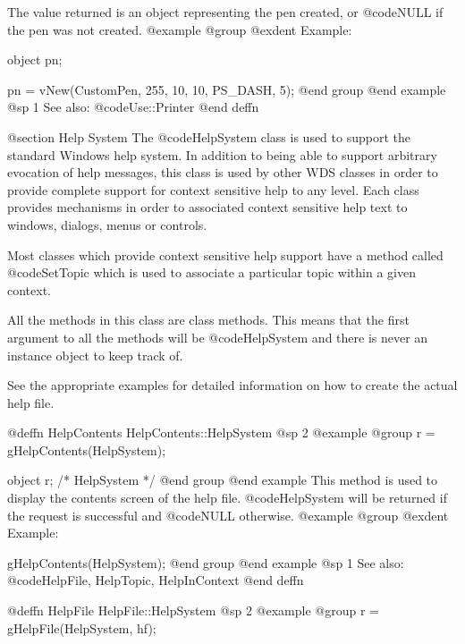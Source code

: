 The value returned is an object representing the pen created, or
@code{NULL} if the pen was not created.
@example
@group
@exdent Example:

object  pn;

pn = vNew(CustomPen, 255, 10, 10, PS_DASH, 5);
@end group
@end example
@sp 1
See also:  @code{Use::Printer}
@end deffn




@section Help System
The @code{HelpSystem} class is used to support the standard Windows
help system.  In addition to being able to support arbitrary evocation
of help messages, this class is used by other WDS classes in order to
provide complete support for context sensitive help to any level.
Each class provides mechanisms in order to associated context sensitive
help text to windows, dialogs, menus or controls.

Most classes which provide context sensitive help support have a method
called @code{SetTopic} which is used to associate a particular topic
within a given context.

All the methods in this class are class methods.  This means that
the first argument to all the methods will be @code{HelpSystem} and
there is never an instance object to keep track of.

See the appropriate examples for detailed information on how to
create the actual help file.











@deffn {HelpContents} HelpContents::HelpSystem
@sp 2
@example
@group
r = gHelpContents(HelpSystem);

object  r;      /*  HelpSystem  */
@end group
@end example
This method is used to display the contents screen of the help file.
@code{HelpSystem} will be returned if the request is successful and
@code{NULL} otherwise.
@example
@group
@exdent Example:

gHelpContents(HelpSystem);
@end group
@end example
@sp 1
See also:  @code{HelpFile, HelpTopic, HelpInContext}
@end deffn















@deffn {HelpFile} HelpFile::HelpSystem
@sp 2
@example
@group
r = gHelpFile(HelpSystem, hf);

